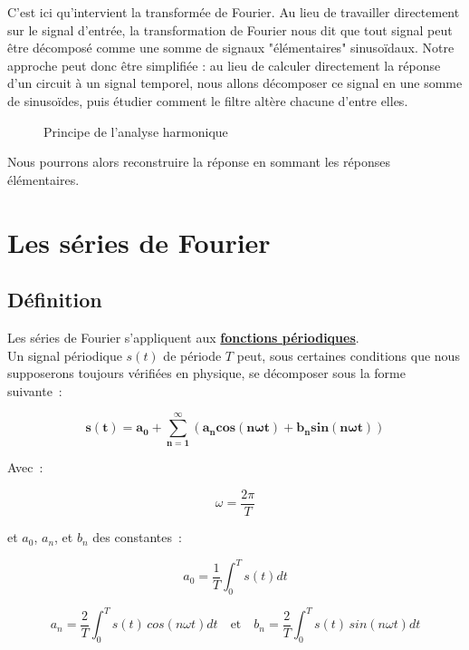 C'est ici qu'intervient la transformée de Fourier. Au lieu de travailler directement sur le signal d'entrée, la transformation de Fourier nous dit que tout signal peut être décomposé comme une somme de signaux "élémentaires" sinusoïdaux. Notre approche peut donc être simplifiée : au lieu de calculer directement la réponse d'un circuit à un signal temporel, nous allons décomposer ce signal en une somme de sinusoïdes, puis étudier comment le filtre altère chacune d'entre elles. \\

\begin{figure}[!h]
\begin{center}

\end{center}
	\caption{Principe de l'analyse harmonique}
\end{figure}

Nous pourrons alors reconstruire la réponse en sommant les réponses élémentaires. 

\section{Les séries de Fourier}

\subsection*{Définition}

Les séries de Fourier s'appliquent aux \textbf{\underline{fonctions périodiques}}. \\

Un signal périodique $s(t)$ de période $T$ peut, sous certaines conditions que nous supposerons toujours vérifiées en physique, se décomposer sous la forme suivante~:

\begin{equation}
	\bm{s(t) = a_0 + \sum_{n=1}^{\infty} \left(a_ncos\left( n\omega t\right) + b_nsin\left(n\omega t\right) \right)}
\end{equation}

Avec~: 

$$\omega=\dfrac{2\pi}{T}$$

et $a_0$, $a_n$, et $b_n$ des constantes~:

$$ a_0 = \dfrac{1}{T} \int_{0}^{T} s(t)dt $$

$$ a_n = \dfrac{2}{T} \int_{0}^{T} s(t)\,cos\left( n\omega t \right) dt \quad  \text{et} \quad b_n = \dfrac{2}{T} \int_{0}^{T} s(t)\,sin\left( n\omega t \right) dt $$  \\

